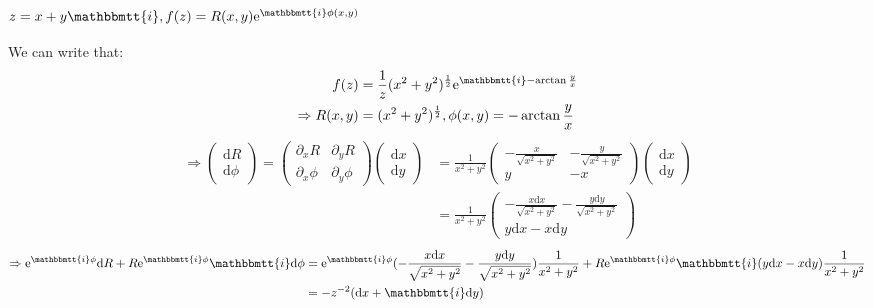 \documentclass[]{ctexart}
\newcommand{\mi}{\mathbbmtt{i}}
\newcommand{\di}{\mathrm{d}}
\newcommand{\pa}{\partial}
\newcommand{\me}{\mathrm{e}}
\begin{document}
		\subsubsection{$z=x+y\mi, f(z)=R(x,y)\me ^{\mi \phi (x,y)}$}
			We can write that:
				\begin{equation*}
				\begin{aligned}
					f(z)&=\frac{1}{z}(x^2+y^2)^{\frac{1}{2}}\me ^{\mi -\arctan\frac{y}{x}}\\
					\Rightarrow R(x,y)&=(x^2+y^2)^{\frac{1}{2}},\phi (x,y)=-\arctan\frac{y}{x}
				\end{aligned}
				\end{equation*}
				\begin{equation*}
				\begin{aligned}
					\Rightarrow
					\begin{pmatrix}
						\di R\\
						\di \phi 
					\end{pmatrix}
					=
					\begin{pmatrix}
						\pa_xR & \pa_{y}R\\
						\pa_x\phi & \pa_{y}\phi
					\end{pmatrix}
					\begin{pmatrix}
						\di x\\
						\di y
					\end{pmatrix}
					&=\frac{1}{x^2+y^2}
					\begin{pmatrix}
						-\frac{x}{\sqrt{x^2+y^2}} & -\frac{y}{\sqrt{x^2+y^2}}\\
						y & -x
					\end{pmatrix}
					\begin{pmatrix}
						\di x\\
						\di y
					\end{pmatrix}\\
					&=\frac{1}{x^2+y^2}
					\begin{pmatrix}
						-\frac{x\di x}{\sqrt{x^2+y^2}} -\frac{y\di y}{\sqrt{x^2+y^2}}\\
						y\di x -x\di y
					\end{pmatrix}
				\end{aligned}
				\end{equation*}
				\begin{equation*}
				\begin{aligned}
					\Rightarrow \me ^{\mi \phi }\di R+R\me ^{\mi \phi}\mi \di \phi&=\me ^{\mi \phi }(-\frac{x\di x}{\sqrt{x^2+y^2}} -\frac{y\di y}{\sqrt{x^2+y^2}})\frac{1}{x^2+y^2}+R\me ^{\mi \phi}\mi(y\di x -x\di y)\frac{1}{x^2+y^2}\\
					&=-z^{-2}(\di x+\mi \di y)
				\end{aligned}
				\end{equation*}
				
\end{document}
